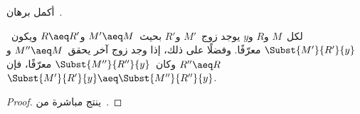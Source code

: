 \documentclass[../../../include/open-logic-section]{subfiles}
\begin{document}
\begin{prob}
  أكمل برهان~.
\end{prob}

\begin{cor}
  لكل~$M$ و$R$ و$y$ يوجد زوج~$M'$ و$R'$ بحيث~$M' \aeq M$ و$R \aeq
  R'$ ويكون~$\Subst{M'}{R'}{y}$ معرّفًا. وفضلًا على ذلك، إذا وجد زوج
  آخر يحقق~$M'' \aeq M$ و$R'' \aeq R$ وكان~$\Subst{M''}{R''}{y}$ معرّفًا،
  فإن~$\Subst{M'}{R'}{y} \aeq \Subst{M''}{R''}{y}$.
\end{cor}

\begin{proof}
  ينتج مباشرة من~.
\end{proof}
\end{document}
